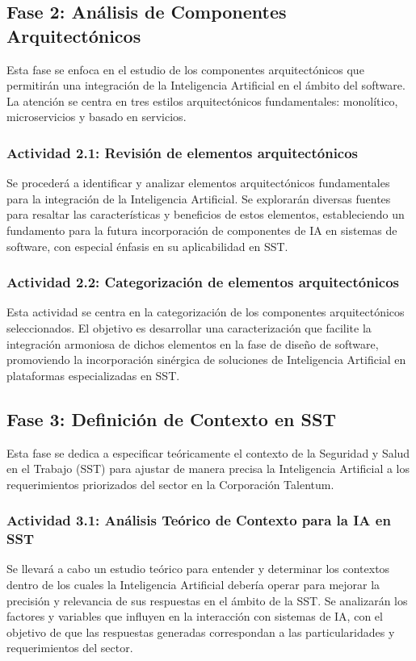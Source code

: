 \subsection{Fase 2: Análisis de Componentes Arquitectónicos}
Esta fase se enfoca en el estudio de los componentes arquitectónicos que permitirán una integración de la Inteligencia Artificial en el ámbito del software. La atención se centra en tres estilos arquitectónicos fundamentales: monolítico, microservicios y basado en servicios.

\subsubsection{Actividad 2.1: Revisión de elementos arquitectónicos}
Se procederá a identificar y analizar elementos arquitectónicos fundamentales para la integración de la Inteligencia Artificial. Se explorarán diversas fuentes para resaltar las características y beneficios de estos elementos, estableciendo un fundamento para la futura incorporación de componentes de IA en sistemas de software, con especial énfasis en su aplicabilidad en SST.

\subsubsection{Actividad 2.2: Categorización de elementos arquitectónicos}
Esta actividad se centra en la categorización de los componentes arquitectónicos seleccionados. El objetivo es desarrollar una caracterización que facilite la integración armoniosa de dichos elementos en la fase de diseño de software, promoviendo la incorporación sinérgica de soluciones de Inteligencia Artificial en plataformas especializadas en SST.





\subsection{Fase 3: Definición de Contexto en SST}
Esta fase se dedica a especificar teóricamente el contexto de la Seguridad y Salud en el Trabajo (SST) para ajustar de manera precisa la Inteligencia Artificial a los requerimientos priorizados del sector en la Corporación Talentum.

\subsubsection{Actividad 3.1: Análisis Teórico de Contexto para la IA en SST}
Se llevará a cabo un estudio teórico para entender y determinar los contextos dentro de los cuales la Inteligencia Artificial debería operar para mejorar la precisión y relevancia de sus respuestas en el ámbito de la SST. Se analizarán los factores y variables que influyen en la interacción con sistemas de IA, con el objetivo de que las respuestas generadas correspondan a las particularidades y requerimientos del sector.




